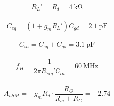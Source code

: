 \documentclass{article}
\begin{document}
\begin{equation*}
  \begin{aligned}
    R_L' = R_d = 4 \  \mathrm{k \Omega}
  \end{aligned}
\end{equation*}

\begin{equation*}
  \begin{aligned}
    C_{eq} = \left( 1 + g_m R_L' \right) C_{gd} = 2.1 \  \mathrm{pF}
  \end{aligned}
\end{equation*}

\begin{equation*}
  \begin{aligned}
    C_{in} = C_{eq} + C_{gs} = 3.1 \  \mathrm{pF}
  \end{aligned}
\end{equation*}

\begin{equation*}
  \begin{aligned}
    f_H = \dfrac{1}{2 \pi R_{sig}' C_{in}} = 60 \  \mathrm{MHz}
  \end{aligned}
\end{equation*}

\begin{equation*}
  \begin{aligned}
    \dot{A}_{vSM} = - g_m R_d \cdot \dfrac{R_G}{R_{si} + R_G} = - 2.74
  \end{aligned}
\end{equation*}
\end{document}
